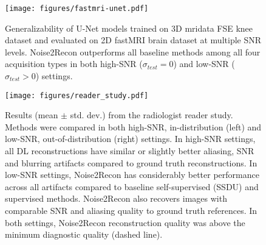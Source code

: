 \documentclass[10pt,twocolumn,letterpaper]{article}
\newcommand{\RV}[1]{{#1}}
\begin{document}
\begin{figure}[t!]
    \centering
    \begin{center}
    \texttt{[image: figures/fastmri-unet.pdf]}
    \end{center}
    \caption{\RV{Generalizability of U-Net models trained on 3D mridata FSE knee dataset and evaluated on 2D fastMRI brain dataset at multiple SNR levels. Noise2Recon  outperforms all baseline methods among all four acquisition types in both high-SNR ($\sigma_{test}=0$) and low-SNR ($\sigma_{test}>0$) settings.}}
    \label{fig:fastmri-unet-noise}
\end{figure}

\begin{figure}[t!]
    \centering
    \begin{center}
        \texttt{[image: figures/reader\_study.pdf]}
    \end{center}
    \caption{\RV{Results (mean $\pm$ std. dev.) from the radiologist reader study. Methods were compared in both high-SNR, in-distribution (left) and low-SNR, out-of-distribution (right) settings. In high-SNR settings, all DL reconstructions have similar or slightly better aliasing, SNR and blurring artifacts compared to ground truth reconstructions. In low-SNR settings, Noise2Recon has considerably better performance across all artifacts compared to baseline self-supervised (SSDU) and supervised methods. Noise2Recon also recovers images with comparable SNR and aliasing quality to ground truth references. In both settings, Noise2Recon reconstruction quality was above the minimum diagnostic quality (dashed line).}}
    \label{fig:reader-study}
\end{figure}
\end{document}
